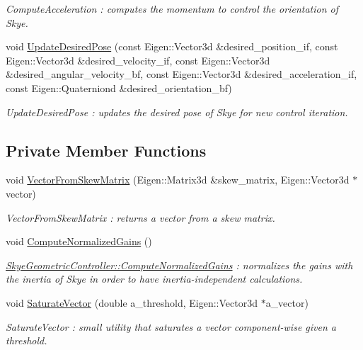\begin{DoxyCompactItemize}
\begin{DoxyCompactList}\small\item\em Compute\-Acceleration \-: computes the momentum to control the orientation of Skye. \end{DoxyCompactList}\item 
void \hyperlink{class_skye_geometric_controller_a47c430b43ad57b8c9ade33d36b2f7ffe}{Update\-Desired\-Pose} (const Eigen\-::\-Vector3d \&desired\-\_\-position\-\_\-if, const Eigen\-::\-Vector3d \&desired\-\_\-velocity\-\_\-if, const Eigen\-::\-Vector3d \&desired\-\_\-angular\-\_\-velocity\-\_\-bf, const Eigen\-::\-Vector3d \&desired\-\_\-acceleration\-\_\-if, const Eigen\-::\-Quaterniond \&desired\-\_\-orientation\-\_\-bf)
\begin{DoxyCompactList}\small\item\em Update\-Desired\-Pose \-: updates the desired pose of Skye for new control iteration. \end{DoxyCompactList}\end{DoxyCompactItemize}
\subsection*{Private Member Functions}
\begin{DoxyCompactItemize}
\item 
void \hyperlink{class_skye_geometric_controller_a7b662c7331963aedd0d978ee13ce222e}{Vector\-From\-Skew\-Matrix} (Eigen\-::\-Matrix3d \&skew\-\_\-matrix, Eigen\-::\-Vector3d $\ast$vector)
\begin{DoxyCompactList}\small\item\em Vector\-From\-Skew\-Matrix \-: returns a vector from a skew matrix. \end{DoxyCompactList}\item 
\hypertarget{class_skye_geometric_controller_a360748121b002192b1019a7fd325dfd5}{void \hyperlink{class_skye_geometric_controller_a360748121b002192b1019a7fd325dfd5}{Compute\-Normalized\-Gains} ()}\label{class_skye_geometric_controller_a360748121b002192b1019a7fd325dfd5}

\begin{DoxyCompactList}\small\item\em \hyperlink{class_skye_geometric_controller_a360748121b002192b1019a7fd325dfd5}{Skye\-Geometric\-Controller\-::\-Compute\-Normalized\-Gains} \-: normalizes the gains with the inertia of Skye in order to have inertia-\/independent calculations. \end{DoxyCompactList}\item 
void \hyperlink{class_skye_geometric_controller_a75b38d5fe2687493eb6c0e917fc0fa1a}{Saturate\-Vector} (double a\-\_\-threshold, Eigen\-::\-Vector3d $\ast$a\-\_\-vector)
\begin{DoxyCompactList}\small\item\em Saturate\-Vector \-: small utility that saturates a vector component-\/wise given a threshold. \end{DoxyCompactList}\end{DoxyCompactItemize}
